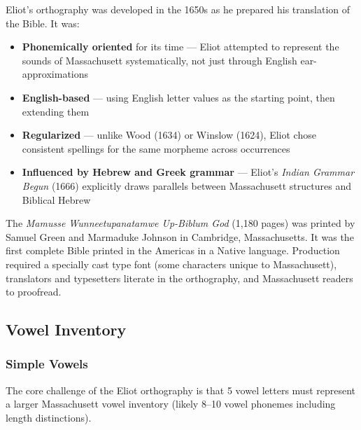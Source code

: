 Eliot's orthography was developed in the 1650s as he prepared his translation
of the Bible. It was:
\begin{itemize}
  \item \textbf{Phonemically oriented} for its time --- Eliot attempted to
    represent the sounds of Massachusett systematically, not just through
    English ear-approximations
  \item \textbf{English-based} --- using English letter values as the starting
    point, then extending them
  \item \textbf{Regularized} --- unlike Wood (1634) or Winslow (1624), Eliot
    chose consistent spellings for the same morpheme across occurrences
  \item \textbf{Influenced by Hebrew and Greek grammar} --- Eliot's
    \emph{Indian Grammar Begun} (1666) explicitly draws parallels between
    Massachusett structures and Biblical Hebrew
\end{itemize}

The \emph{Mamusse Wunneetupanatamwe Up-Biblum God} (1,180 pages) was printed
by Samuel Green and Marmaduke Johnson in Cambridge, Massachusetts. It was the
first complete Bible printed in the Americas in a Native language. Production
required a specially cast type font (some characters unique to Massachusett),
translators and typesetters literate in the orthography, and Massachusett
readers to proofread.

\subsection{Vowel Inventory}

\subsubsection{Simple Vowels}

The core challenge of the Eliot orthography is that 5 vowel letters must
represent a larger Massachusett vowel inventory (likely 8--10 vowel phonemes
including length distinctions).

